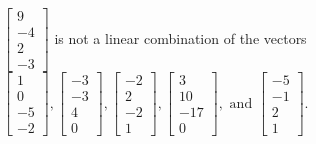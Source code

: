 \begin{exercise}
\begin{exerciseStatement}
  \end{exerciseStatement}
  \begin{exerciseAnswer}
   \(\left[\begin{array}{c}
9 \\
-4 \\
2 \\
-3
\end{array}\right]\) 
  	 is not  
	a linear combination of the vectors \(\left[\begin{array}{c}
1 \\
0 \\
-5 \\
-2
\end{array}\right] , \left[\begin{array}{c}
-3 \\
-3 \\
4 \\
0
\end{array}\right] , \left[\begin{array}{c}
-2 \\
2 \\
-2 \\
1
\end{array}\right] , \left[\begin{array}{c}
3 \\
10 \\
-17 \\
0
\end{array}\right] , \text{ and } \left[\begin{array}{c}
-5 \\
-1 \\
2 \\
1
\end{array}\right]\).

	
  


  \end{exerciseAnswer}
\end{exercise}